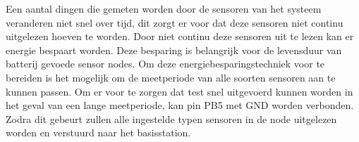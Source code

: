 Een aantal dingen die gemeten worden door de sensoren van het systeem veranderen niet snel over tijd, dit zorgt er voor dat deze sensoren niet continu uitgelezen hoeven te worden. Door niet continu deze sensoren uit te lezen kan er energie bespaart worden. Deze besparing is belangrijk voor de levensduur van batterij gevoede sensor nodes. Om deze energiebesparingstechniek voor te bereiden is het mogelijk om de meetperiode van alle soorten sensoren aan te kunnen passen. 
Om er voor te zorgen dat test snel uitgevoerd kunnen worden in het geval van een lange meetperiode, kan pin PB5 met GND worden verbonden. Zodra dit gebeurt zullen alle ingestelde typen sensoren in de node uitgelezen worden en verstuurd naar het basisstation.